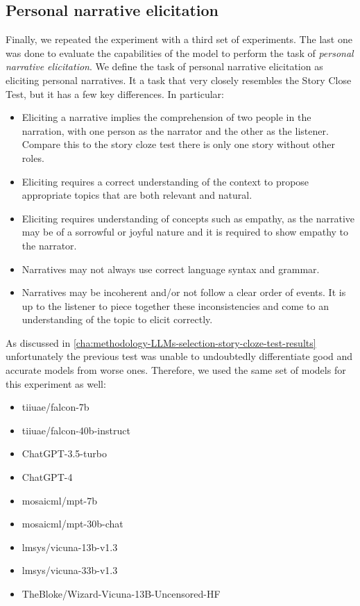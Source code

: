 \subsection{Personal narrative elicitation}
\label{cha:methodology-personal-narrative-elicitation}
Finally, we repeated the experiment with a third set of experiments. The last one was done to evaluate the capabilities of the model to perform the task of \emph{personal narrative elicitation}. We define the task of personal narrative elicitation as eliciting personal narratives. It a task that very closely resembles the Story Close Test, but it has a few key differences. In particular:
\begin{itemize}
    \item  Eliciting a narrative implies the comprehension of two people in the narration, with one person as the narrator and the other as the listener. Compare this to the story cloze test there is only one story without other roles.
    \item  Eliciting requires a correct understanding of the context to propose appropriate topics that are both relevant and natural.
    \item Eliciting requires understanding of concepts such as empathy, as the narrative may be of a sorrowful or joyful nature and it is required to show empathy to the narrator.
    \item Narratives may not always use correct language syntax and grammar.
    \item Narratives may be incoherent and/or not follow a clear order of events. It is up to the listener to piece together these inconsistencies and come to an understanding of the topic to elicit correctly.
\end{itemize}
As discussed in \ref{cha:methodology-LLMs-selection-story-cloze-test-results} unfortunately the previous test was unable to undoubtedly differentiate good and accurate models from worse ones. Therefore, we used the same set of models for this experiment as well:
\begin{itemize}
    \item   tiiuae/falcon-7b
    \item   tiiuae/falcon-40b-instruct
    \item   ChatGPT-3.5-turbo
    \item   ChatGPT-4
    \item   mosaicml/mpt-7b
    \item   mosaicml/mpt-30b-chat
    \item   lmsys/vicuna-13b-v1.3
    \item   lmsys/vicuna-33b-v1.3
    \item   TheBloke/Wizard-Vicuna-13B-Uncensored-HF
\end{itemize}
